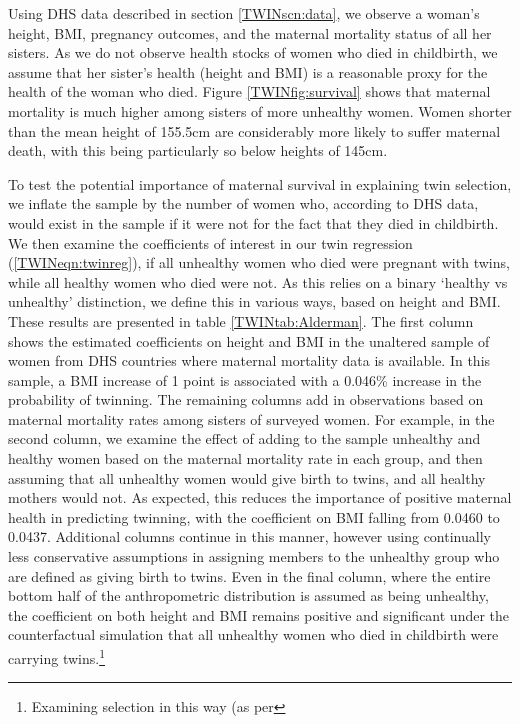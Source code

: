 \documentclass[subeqn]{article}
\begin{document}
\begin{spacing}{1.4}
Using DHS data described in section \ref{TWINscn:data}, we observe a woman's
height, BMI, pregnancy outcomes, and the maternal mortality status of all her
sisters.  As we do not observe health stocks of women who died in childbirth,
we assume that her sister's health (height and BMI) is a reasonable proxy for
the health of the woman who died.  Figure \ref{TWINfig:survival} shows that
maternal mortality is much higher among sisters of more unhealthy women.
Women shorter than the mean height of 155.5cm are considerably more likely to
suffer maternal death, with this being particularly so below heights of 145cm.

To test the potential importance of maternal survival in explaining twin 
selection, we inflate the sample by the number of women who, according to 
DHS data, would exist in the sample if it were not for the fact that they died
in childbirth.  We then examine the coefficients of interest in our twin 
regression (\ref{TWINeqn:twinreg}), if all unhealthy women who died were 
pregnant with twins, while all healthy women who died were not.  As this relies 
on a binary `healthy vs unhealthy' distinction, we define this in various ways, 
based on height and BMI.  These results are presented in table 
\ref{TWINtab:Alderman}.  The first column shows the estimated coefficients on 
height and BMI in the unaltered sample of women from DHS countries where 
maternal mortality data is available.  In this sample, a BMI increase of 1 
point is associated with a 0.046\% increase in the probability of twinning. The 
remaining columns add in observations based on maternal mortality rates among 
sisters of surveyed women.  For example, in the second column, we examine the 
effect of adding to the sample unhealthy and healthy women based on the
maternal mortality rate in each group, and then assuming that all unhealthy
women would give birth to twins, and all healthy mothers would not. As
expected, this reduces the importance of positive maternal health in predicting
twinning, with the coefficient on BMI falling from 0.0460 to 0.0437. Additional
columns continue in this manner, however using continually less conservative
assumptions in assigning members to the unhealthy group who are defined as
giving birth to twins. Even in the final column, where the entire bottom half
of the anthropometric distribution is assumed as being unhealthy, the
coefficient on both height and BMI remains positive and significant under the
counterfactual simulation that all unhealthy women who died in childbirth were
carrying twins.\footnote{Examining selection in this way (as per
}
\end{spacing}
\end{document}
